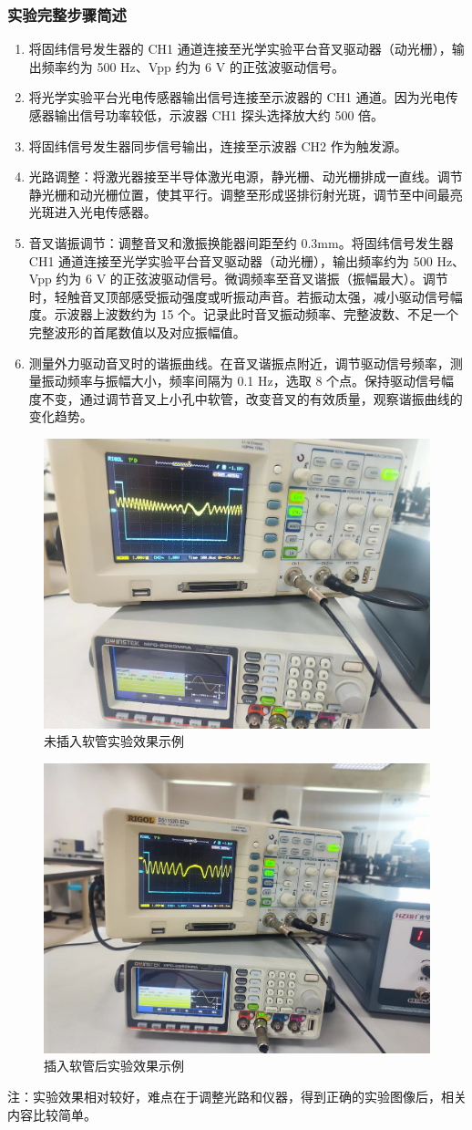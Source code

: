 \documentclass[dvipsnames, svgnames,a4paper,11pt]{article}
\begin{document}
	\subsubsection{实验完整步骤简述}
	\begin{enumerate}
		\item 将固纬信号发生器的 CH1 通道连接至光学实验平台音叉驱动器（动光栅），输出频率约为 500 Hz、Vpp 约为 6 V 的正弦波驱动信号。
		
		\item 将光学实验平台光电传感器输出信号连接至示波器的 CH1 通道。因为光电传感器输出信号功率较低，示波器 CH1 探头选择放大约 500 倍。
		
		\item 将固纬信号发生器同步信号输出，连接至示波器 CH2 作为触发源。

		
		\item 光路调整：将激光器接至半导体激光电源，静光栅、动光栅排成一直线。调节静光栅和动光栅位置，使其平行。调整至形成竖排衍射光斑，调节至中间最亮光斑进入光电传感器。
		
		\item 音叉谐振调节：调整音叉和激振换能器间距至约 0.3mm。将固纬信号发生器 CH1 通道连接至光学实验平台音叉驱动器（动光栅），输出频率约为 500 Hz、Vpp 约为 6 V 的正弦波驱动信号。微调频率至音叉谐振（振幅最大）。调节时，轻触音叉顶部感受振动强度或听振动声音。若振动太强，减小驱动信号幅度。示波器上波数约为 15 个。记录此时音叉振动频率、完整波数、不足一个完整波形的首尾数值以及对应振幅值。
		
		\item 测量外力驱动音叉时的谐振曲线。在音叉谐振点附近，调节驱动信号频率，测量振动频率与振幅大小，频率间隔为 0.1 Hz，选取 8 个点。保持驱动信号幅度不变，通过调节音叉上小孔中软管，改变音叉的有效质量，观察谐振曲线的变化趋势。
	\end{enumerate}
	\begin{figure}[H]
		\centering
		\includegraphics[width=0.4\linewidth]{images/实验剪影1}
		\caption{未插入软管实验效果示例}
		\label{实验剪影1}
	\end{figure}
	\begin{figure}[H]
		\centering
		\includegraphics[width=0.4\linewidth]{images/实验剪影2}
		\caption{插入软管后实验效果示例}
		\label{实验剪影2}
	\end{figure}
	注：实验效果相对较好，难点在于调整光路和仪器，得到正确的实验图像后，相关内容比较简单。
\end{document}
